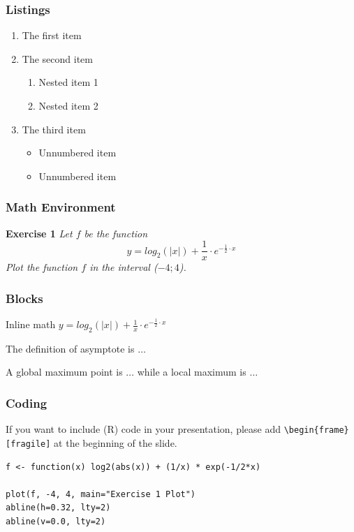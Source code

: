 \documentclass[11pt, xcolor=dvipsnames]{beamer}
\begin{document}
\begin{frame}
\frametitle{Listings}
\begin{enumerate}
	\item The first item 
	\item The second item
	\begin{enumerate}
		\item Nested item 1
		\item Nested item 2
	\end{enumerate}
	\item The third item
	\begin{itemize}
		\item Unnumbered item
		\item Unnumbered item	
	\end{itemize}
\end{enumerate}
\end{frame}


\begin{frame}
\frametitle{Math Environment}
\textbf{Exercise 1}
\textit{Let $f$ be the function}
	\begin{equation}
		y = log_2(|x|) + \frac{1}{x} \cdot e^{-\frac{1}{2} \cdot x}
	\label{equation-1}
	\end{equation}
	\textit{Plot the function $f$ in the interval ($-4; 4$).}
\end{frame}

\begin{frame}[fragile]
\frametitle{Blocks}
\begin{Example}
	Inline math $y = log_2(|x|) + \frac{1}{x} \cdot e^{-\frac{1}{2} \cdot x}$
\end{Example}
\pause
\begin{definition}
The definition of asymptote is $\hdots$
\end{definition}
\pause
\begin{theorem}
	A global maximum point is $\hdots$ while a local maximum is $\hdots$
\end{theorem}
\end{frame}

\begin{frame}[fragile]
\frametitle{Coding}
If you want to include (\textsf{R}) code in your presentation, please add \texttt{\textbackslash begin\{frame\}[fragile]} at the beginning of the slide. \bigskip
\begin{lstlisting}
f <- function(x) log2(abs(x)) + (1/x) * exp(-1/2*x)

plot(f, -4, 4, main="Exercise 1 Plot")
abline(h=0.32, lty=2)
abline(v=0.0, lty=2)
\end{lstlisting} 
\end{frame}
\end{document}
